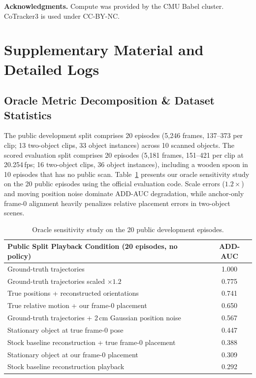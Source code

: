 \documentclass[10pt]{nvidiaextabstract}
\begin{document}
\textbf{Acknowledgments.} Compute was provided by the CMU Babel cluster. CoTracker3 is used under CC-BY-NC.




\clearpage
\appendix

\section{Supplementary Material and Detailed Logs}
\label{sec:appendix}

\subsection{Oracle Metric Decomposition \& Dataset Statistics}
\label{app:oracle}
The public development split comprises 20 episodes (5,246 frames, 137--373 per clip; 13 two-object clips, 33 object instances) across 10 scanned objects. The scored evaluation split comprises 20 episodes (5,181 frames, 151--421 per clip at 20.254\,fps; 16 two-object clips, 36 object instances), including a wooden spoon in 10 episodes that has no public scan. Table~\ref{tab:oracle} presents our oracle sensitivity study on the 20 public episodes using the official evaluation code. Scale errors ($1.2\times$) and moving position noise dominate ADD-AUC degradation, while anchor-only frame-0 alignment heavily penalizes relative placement errors in two-object scenes.

\begin{table}[h]
  \centering\small
  \begin{tabular}{@{}lc@{}}
    \toprule
    \textbf{Public Split Playback Condition (20 episodes, no policy)} & \textbf{ADD-AUC} \\
    \midrule
    Ground-truth trajectories & 1.000 \\
    Ground-truth trajectories scaled $\times 1.2$ & 0.775 \\
    True positions + reconstructed orientations & 0.741 \\
    True relative motion + our frame-0 placement & 0.650 \\
    Ground-truth trajectories + 2\,cm Gaussian position noise & 0.567 \\
    Stationary object at true frame-0 pose & 0.447 \\
    Stock baseline reconstruction + true frame-0 placement & 0.388 \\
    Stationary object at our frame-0 placement & 0.309 \\
    Stock baseline reconstruction playback & 0.292 \\
    \bottomrule
  \end{tabular}
  \caption{Oracle sensitivity study on the 20 public development episodes.}
  \label{tab:oracle}
\end{table}
\end{document}
